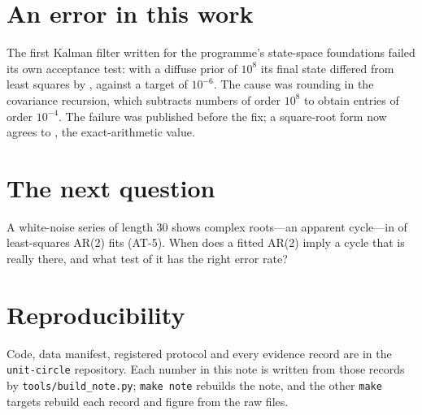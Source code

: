 \documentclass[11pt,a4paper]{article}
\begin{document}
\section{An error in this work}

The first Kalman filter written for the programme's state-space foundations failed its own acceptance test: with a diffuse prior of $10^8$ its final state differed from least squares by \ATelevenFirst, against a target of $10^{-6}$. The cause was rounding in the covariance recursion, which subtracts numbers of order $10^8$ to obtain entries of order $10^{-4}$. The failure was published before the fix; a square-root form now agrees to \ATelevenFixed, the exact-arithmetic value.

\section{The next question}

A white-noise series of length 30 shows complex roots---an apparent cycle---in \ATfiveThirtyPercent{} of least-squares AR(2) fits (AT-5). When does a fitted AR(2) imply a cycle that is really there, and what test of it has the right error rate?

\section*{Reproducibility}

Code, data manifest, registered protocol and every evidence record are in the \texttt{unit-circle} repository. Each number in this note is written from those records by \texttt{tools/build\_note.py}; \texttt{make note} rebuilds the note, and the other \texttt{make} targets rebuild each record and figure from the raw files.
\end{document}
